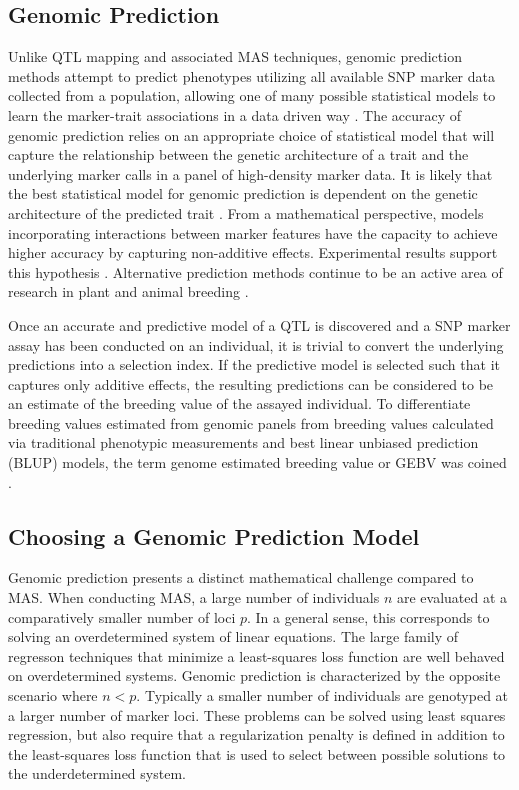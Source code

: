 \subsection{Genomic Prediction}

Unlike QTL mapping and associated MAS techniques, genomic prediction methods 
attempt to predict phenotypes utilizing all available SNP marker data collected 
from a population, allowing one of many possible statistical models to learn 
the marker-trait associations in a data driven way \citep{meuwissen2001}. 
The accuracy of genomic prediction relies on an appropriate choice of statistical model that 
will capture the relationship between the genetic architecture
of a trait and the underlying marker calls in a panel of high-density marker 
data. It is likely that the best statistical model for genomic prediction is 
dependent on the genetic architecture of 
the predicted trait \citep{crossa2010, gonzalez-camacho2012, 
resende2012, cleveland2012, thavamanikumar2015}.  From a mathematical perspective,
models incorporating interactions between marker features have the 
capacity to achieve higher accuracy by capturing non-additive effects. 
Experimental results support this hypothesis \citep{gonzalez-camacho2012}. 
Alternative prediction methods continue to be an active area of research 
in plant and animal breeding \citep{koning2012}.

Once an accurate and predictive model of a QTL is discovered and a SNP marker
assay has been conducted on an individual, it is trivial to convert the underlying
predictions into a selection index. If the predictive model is selected 
such that it captures only additive effects, the resulting predictions can be 
considered to be an estimate of the breeding value of the assayed individual.
To differentiate breeding values estimated from genomic panels from breeding values
calculated via traditional phenotypic measurements and best linear unbiased prediction (BLUP)
models, the term genome estimated breeding value or GEBV was coined \citep{meuwissen2002}.

\subsection{Choosing a Genomic Prediction Model}

Genomic prediction presents a distinct mathematical challenge compared to MAS.
When conducting MAS, a large number of individuals $n$ are evaluated at a
comparatively smaller number of loci $p$. In a general sense, this corresponds 
to solving an overdetermined system of linear equations. The large family of 
regresson techniques that minimize a least-squares loss function are well
behaved on overdetermined systems. Genomic prediction is characterized by the opposite
scenario where $n < p$. Typically a smaller number of individuals are genotyped
at a larger number of marker loci. These problems can be solved using least squares regression,
but also require that a regularization penalty is defined in addition to the least-squares 
loss function that is used to select between possible solutions to the underdetermined
system. 

